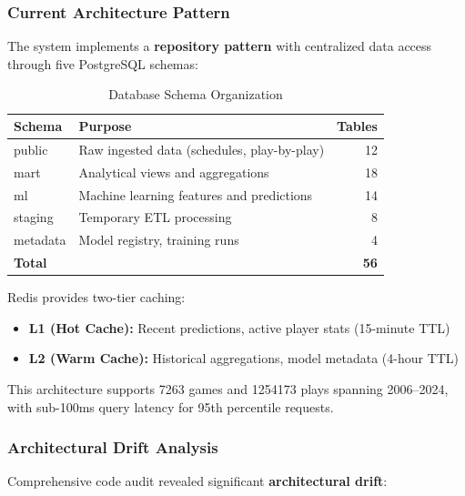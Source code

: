 \subsubsection{Current Architecture Pattern}

The system implements a \textbf{repository pattern} with centralized data access through five PostgreSQL schemas:

\begin{table}[htbp]
\centering
\caption{Database Schema Organization}
\label{tab:schema_organization}
\begin{tabular}{@{}lp{6cm}r@{}}
\toprule
\textbf{Schema} & \textbf{Purpose} & \textbf{Tables} \\
\midrule
public & Raw ingested data (schedules, play-by-play) & 12 \\
mart & Analytical views and aggregations & 18 \\
ml & Machine learning features and predictions & 14 \\
staging & Temporary ETL processing & 8 \\
metadata & Model registry, training runs & 4 \\
\midrule
\textbf{Total} & & \textbf{56} \\
\bottomrule
\end{tabular}
\end{table}

Redis provides two-tier caching:
\begin{itemize}
    \item \textbf{L1 (Hot Cache):} Recent predictions, active player stats (15-minute TTL)
    \item \textbf{L2 (Warm Cache):} Historical aggregations, model metadata (4-hour TTL)
\end{itemize}

This architecture supports \SI{7263}{} games and \SI{1254173}{} plays spanning 2006--2024, with sub-100ms query latency for 95th percentile requests.

\subsubsection{Architectural Drift Analysis}

Comprehensive code audit revealed significant \textbf{architectural drift}:

